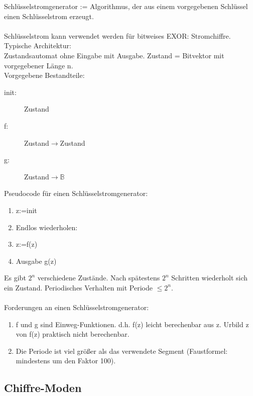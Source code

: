 \documentclass[a4paper,12pt]{article}
\begin{document}
Schlüsselstromgenerator := Algorithmus, der aus einem vorgegebenen Schlüssel einen Schlüsselstrom erzeugt.\\
\\
Schlüsselstrom kann verwendet werden für bitweises EXOR: \glqq{}Stromchiffre\grqq{}.\\
Typische Architektur:\\
Zustandsautomat ohne Eingabe mit Ausgabe. Zustand = Bitvektor mit vorgegebener Länge n.\\
Vorgegebene Bestandteile:
\begin{description}
 \item[init:] Zustand
 \item[f:] Zustand$\rightarrow$Zustand
 \item[g:] Zustand$\rightarrow\mathbb{B}$
\end{description}
Pseudocode für einen Schlüsselstromgenerator:
\begin{enumerate}
 \item z:=init
 \item Endlos wiederholen:
 \item z:=f(z)
 \item Ausgabe g(z)
\end{enumerate}

Es gibt $2^n$ verschiedene Zustände. Nach spätestens $2^n$ Schritten wiederholt sich ein Zustand. Periodisches Verhalten mit Periode $\leq2^n$.\\
\\
Forderungen an einen Schlüsselstromgenerator:
\begin{enumerate}
 \item f und g sind Einweg-Funktionen. d.h. f(z) leicht berechenbar aus z. Urbild z von f(z) praktisch nicht berechenbar.
 \item Die Periode ist viel größer als das verwendete Segment (Faustformel: mindestens um den Faktor 100).
\end{enumerate}

\subsection{Chiffre-Moden}
\end{document}
